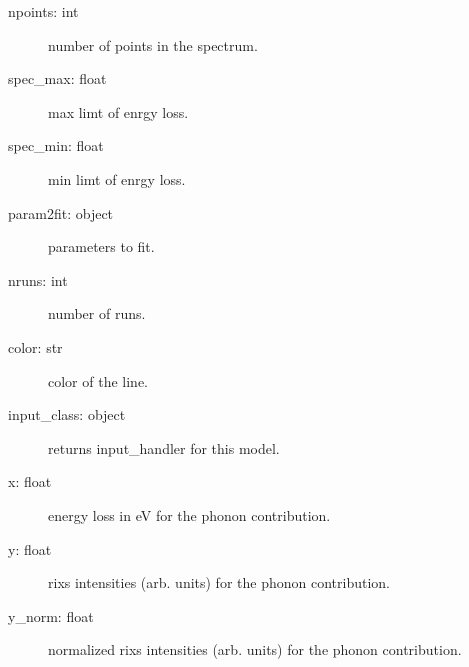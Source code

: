 \documentclass[letterpaper,10pt,english]{sphinxmanual}
\begin{document}
\begin{fulllineitems}
\begin{description}
\begin{description}
\item[{npoints: int}] \leavevmode
number of points in the spectrum.

\item[{spec\_max: float}] \leavevmode
max limt of enrgy loss.

\item[{spec\_min: float}] \leavevmode
min limt of enrgy loss.

\item[{param2fit: object}] \leavevmode
parameters to fit.

\item[{nruns: int}] \leavevmode
number of runs.

\item[{color: str}] \leavevmode
color of the line.

\item[{input\_class: object}] \leavevmode
returns input\_handler for this model.

\item[{x: float}] \leavevmode
energy loss in eV for the phonon contribution.

\item[{y: float}] \leavevmode
rixs intensities (arb. units) for the phonon contribution.

\item[{y\_norm: float}] \leavevmode
normalized rixs intensities (arb. units) for the phonon contribution.

\end{description}

\end{description}

\end{fulllineitems}

\end{document}

